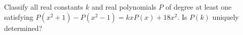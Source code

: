 Classify all real constants $k$ and real polynomials $P$ of degree at least one satisfying $P(x^2+1)-P(x^2-1)=kxP(x)+18x^2$. Is $P(k)$ uniquely determined?
